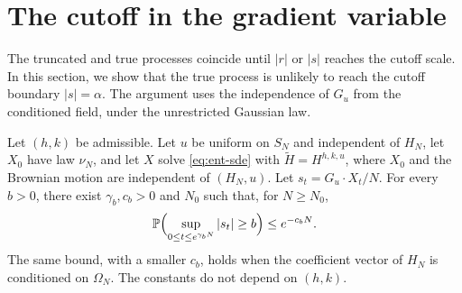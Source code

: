 \section{The cutoff in the gradient variable}\label{sec:ent-boundary}

The truncated and true processes coincide until $|r|$ or $|s|$ reaches the
cutoff scale. In this section, we show that the true process is unlikely to
reach the cutoff boundary $|s|=\alpha$. The argument uses the independence of $G_u$
from the conditioned field, under the unrestricted Gaussian law.

\begin{lemma}\label{lem:ent-boundary}
Let $(h,k)$ be admissible. Let $u$ be uniform on $S_N$ and independent of
$H_N$, let $X_0$ have law $\nu_N$, and let $X$ solve \eqref{eq:ent-sde} with
$\widetilde H=H^{h,k,u}$, where $X_0$ and the Brownian motion are
independent of $(H_N,u)$. Let $s_t=G_u\cdot X_t/N$. For every $b>0$, there
exist $\gamma_b,c_b>0$ and $N_0$ such that, for $N\ge N_0$,
\begin{equation}\label{eq:ent-boundary}
 \mathbb P\Bigl(\sup_{0\le t\le e^{\gamma_bN}}|s_t|\ge b\Bigr)\le e^{-c_bN}.
\end{equation}
The same bound, with a smaller $c_b$, holds when the coefficient vector of
$H_N$ is conditioned on $\Omega_N$. The constants do not depend on $(h,k)$.
\end{lemma}

